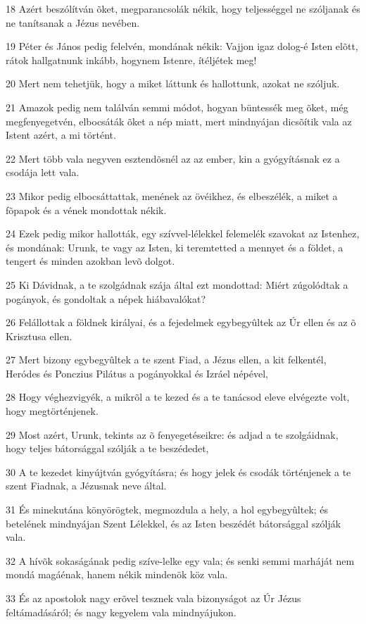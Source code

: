 \par 18 Azért beszólítván õket, megparancsolák nékik, hogy teljességgel ne szóljanak és ne tanítsanak a Jézus nevében.
\par 19 Péter és János pedig felelvén, mondának nékik: Vajjon igaz dolog-é Isten elõtt, rátok hallgatnunk inkább, hogynem Istenre, ítéljétek meg!
\par 20 Mert nem tehetjük, hogy a miket láttunk és hallottunk, azokat ne szóljuk.
\par 21 Amazok pedig nem találván semmi módot, hogyan büntessék meg õket, még megfenyegetvén, elbocsáták õket a nép miatt, mert mindnyájan dicsõítik vala az Istent azért, a mi történt.
\par 22 Mert több vala negyven esztendõsnél az az ember, kin a gyógyításnak ez a csodája lett vala.
\par 23 Mikor pedig elbocsáttattak, menének az övéikhez, és elbeszélék, a miket a fõpapok és a vének mondottak nékik.
\par 24 Ezek pedig mikor hallották, egy szívvel-lélekkel felemelék szavokat az Istenhez, és mondának: Urunk, te vagy az Isten, ki teremtetted a mennyet és a földet, a tengert és minden azokban levõ dolgot.
\par 25 Ki Dávidnak, a te szolgádnak szája által ezt mondottad: Miért zúgolódtak a pogányok, és gondoltak a népek hiábavalókat?
\par 26 Felállottak a földnek királyai, és a fejedelmek egybegyûltek az Úr ellen és az õ Krisztusa ellen.
\par 27 Mert bizony egybegyûltek a te szent Fiad, a Jézus ellen, a kit felkentél, Heródes és Ponczius Pilátus a pogányokkal és Izráel népével,
\par 28 Hogy véghezvigyék, a mikrõl a te kezed és a te tanácsod eleve elvégezte volt, hogy megtörténjenek.
\par 29 Most azért, Urunk, tekints az õ fenyegetéseikre: és adjad a te szolgáidnak, hogy teljes bátorsággal szólják a te beszédedet,
\par 30 A te kezedet kinyújtván gyógyításra; és hogy jelek és csodák történjenek a te szent Fiadnak, a Jézusnak neve által.
\par 31 És minekutána könyörögtek, megmozdula a hely, a hol egybegyûltek; és betelének mindnyájan Szent Lélekkel, és az Isten beszédét bátorsággal szólják vala.
\par 32 A hívõk sokaságának pedig szíve-lelke egy vala; és senki semmi marháját nem mondá magáénak, hanem nékik mindenök köz vala.
\par 33 És az apostolok nagy erõvel tesznek vala bizonyságot az Úr Jézus feltámadásáról; és nagy kegyelem vala mindnyájukon.

